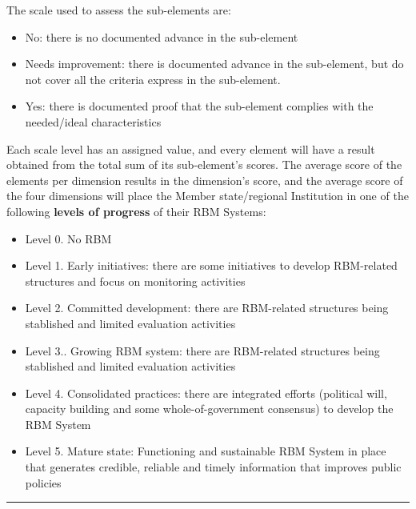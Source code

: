 \documentclass[
  10pt,
]{book}
\providecommand{\tightlist}{%
  \setlength{\itemsep}{0pt}\setlength{\parskip}{0pt}}
\begin{document}
The scale used to assess the sub-elements are:

\begin{itemize}
\tightlist
\item
  No: there is no documented advance in the sub-element
\item
  Needs improvement: there is documented advance in the sub-element, but do not cover all the criteria express in the sub-element.
\item
  Yes: there is documented proof that the sub-element complies with the needed/ideal characteristics
\end{itemize}

Each scale level has an assigned value, and every element will have a result obtained from the total sum of its sub-element's scores. The average score of the elements per dimension results in the dimension's score, and the average score of the four dimensions will place the Member state/regional Institution in one of the following \textbf{levels of progress} of their RBM Systems:

\begin{itemize}
\tightlist
\item
  Level 0. No RBM
\item
  Level 1. Early initiatives: there are some initiatives to develop RBM-related structures and focus on monitoring activities
\item
  Level 2. Committed development: there are RBM-related structures being stablished and limited evaluation activities
\item
  Level 3.. Growing RBM system: there are RBM-related structures being stablished and limited evaluation activities
\item
  Level 4. Consolidated practices: there are integrated efforts (political will, capacity building and some whole-of-government consensus) to develop the RBM System
\item
  Level 5. Mature state: Functioning and sustainable RBM System in place that generates credible, reliable and timely information that improves public policies
\end{itemize}

\begin{center}\rule{0.5\linewidth}{0.5pt}\end{center}
\end{document}
